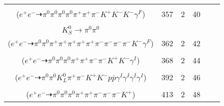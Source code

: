 \documentclass[landscape]{article}
\newcounter{rownumbers}
\newcommand\rn{\stepcounter{rownumbers}\arabic{rownumbers}}
\newcommand{\EOL}{\\} %
\newcommand{\topoTags}[1]{#1} %
\begin{document}
\begin{longtable}{clcccc}
\rn & \makecell[l]{ $ 
e^{+} e^{-} \rightarrow \pi^{0} \rho^{+} K^{*} K^{-} K^{-} K^{*+} ,
\rho^{+} \rightarrow \pi^{0} \pi^{+} ,
K^{*} \rightarrow \pi^{-} K^{+} ,
K^{*+} \rightarrow \pi^{+} K^{0} \gamma^{F} ,
K^{0} \rightarrow K_{S}^{0} ,
K_{S}^{0} \rightarrow \pi^{0} \pi^{0} 
$ \\ ($
e^{+} e^{-} \dashrightarrow \pi^{0} \pi^{0} \pi^{0} \pi^{0} \pi^{+} \pi^{+} \pi^{-} K^{+} K^{-} K^{-} \gamma^{F} 
$) } & \topoTags{357 & }2 & 40 \EOL

\rn & \makecell[l]{ $ 
e^{+} e^{-} \rightarrow \rho^{0} \rho^{0} \pi^{+} \pi^{-} \pi^{-} \bar{K}^{*} K^{*+} ,
\rho^{0} \rightarrow \pi^{+} \pi^{-} ,
\rho^{0} \rightarrow \pi^{+} \pi^{-} \gamma^{F} ,
\bar{K}^{*} \rightarrow \pi^{+} K^{-} ,
K^{*+} \rightarrow \pi^{+} K^{0} ,
K^{0} \rightarrow K_{S}^{0} ,
$ \\ $
K_{S}^{0} \rightarrow \pi^{0} \pi^{0} 
$ \\ ($
e^{+} e^{-} \dashrightarrow \pi^{0} \pi^{0} \pi^{+} \pi^{+} \pi^{+} \pi^{+} \pi^{+} \pi^{-} \pi^{-} \pi^{-} \pi^{-} K^{-} \gamma^{F} 
$) } & \topoTags{362 & }2 & 42 \EOL

\rn & \makecell[l]{ $ 
e^{+} e^{-} \rightarrow \pi^{0} \pi^{+} \rho^{+} \rho^{-} K^{*} K^{-} \gamma^{I} ,
\rho^{+} \rightarrow \pi^{0} \pi^{+} ,
\rho^{-} \rightarrow \pi^{0} \pi^{-} ,
K^{*} \rightarrow \pi^{-} K^{+} 
$ \\ ($
e^{+} e^{-} \dashrightarrow \pi^{0} \pi^{0} \pi^{0} \pi^{+} \pi^{+} \pi^{-} \pi^{-} K^{+} K^{-} \gamma^{I} 
$) } & \topoTags{368 & }2 & 44 \EOL

\rn & \makecell[l]{ $ 
e^{+} e^{-} \rightarrow \pi^{-} \rho^{+} \bar{K}^{0} K^{+} K^{-} p \bar{\Sigma}^{-} \gamma^{I} \gamma^{I} \gamma^{I} \gamma^{I} ,
\rho^{+} \rightarrow \pi^{0} \pi^{+} ,
\bar{K}^{0} \rightarrow K_{L}^{0} ,
\bar{\Sigma}^{-} \rightarrow \pi^{0} \bar{p} 
$ \\ ($
e^{+} e^{-} \dashrightarrow \pi^{0} \pi^{0} K_{L}^{0} \pi^{+} \pi^{-} K^{+} K^{-} p \bar{p} \gamma^{I} \gamma^{I} \gamma^{I} \gamma^{I} 
$) } & \topoTags{392 & }2 & 46 \EOL

\rn & \makecell[l]{ $ 
e^{+} e^{-} \rightarrow \pi^{0} \pi^{+} \pi^{-} \rho^{-} \bar{K}^{*} K^{+} ,
\rho^{-} \rightarrow \pi^{0} \pi^{-} ,
\bar{K}^{*} \rightarrow \pi^{0} \bar{K}^{0} ,
\bar{K}^{0} \rightarrow K_{S}^{0} ,
K_{S}^{0} \rightarrow \pi^{+} \pi^{-} 
$ \\ ($
e^{+} e^{-} \dashrightarrow \pi^{0} \pi^{0} \pi^{0} \pi^{+} \pi^{+} \pi^{-} \pi^{-} \pi^{-} K^{+} 
$) } & \topoTags{413 & }2 & 48 \EOL


\end{longtable}
\end{document}
